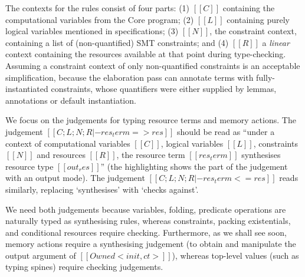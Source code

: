 \documentclass[11pt]{article}%
\begin{document}
The contexts for the rules consist of four parts: (1) $[[ C ]]$ containing the
computational variables from the Core program; (2) $[[ L ]]$ containing purely
logical variables mentioned in specifications; (3) $[[ N ]]$, the constraint
context, containing a list of (non-quantified) SMT constraints; and (4) $[[ R ]]$ a
\emph{linear} context containing the resources available at that point during
type-checking. Assuming a constraint context of only non-quantified constraints
is an acceptable simplification, because the elaboration pass can annotate terms
with fully-instantiated constraints, whose quantifiers were either supplied
by lemmas, annotations or default instantiation.

We focus on the judgements for typing resource terms and memory actions. The
judgement $[[ C ; L ; N ; R |- res_term => res ]]$ should be read as ``under a
context of computational variables $[[ C ]]$, logical variables $[[ L ]]$,
constraints $[[ N ]]$ and resources $[[ R ]]$, the resource term
$[[ res_term ]]$ synthesises resource type $[[ out_res ]]$'' (the highlighting shows the
part of the judgement with an \colorbox{red!10}{output mode}). The judgement
$[[ C ; L ; N ; R |- res_term <= res ]]$ reads similarly, replacing
`synthesises' with `checks against'.

We need both judgements because variables, folding, predicate operations are
naturally typed as synthesising rules, whereas constraints, packing
existentials, and conditional resources require checking.  Furthermore, as we
shall see soon, memory actions require a synthesising judgement (to obtain and
manipulate the output argument of $[[ Owned < init , ct > ]]$), whereas top-level
values (such as typing spines) require checking judgements.
\end{document}
